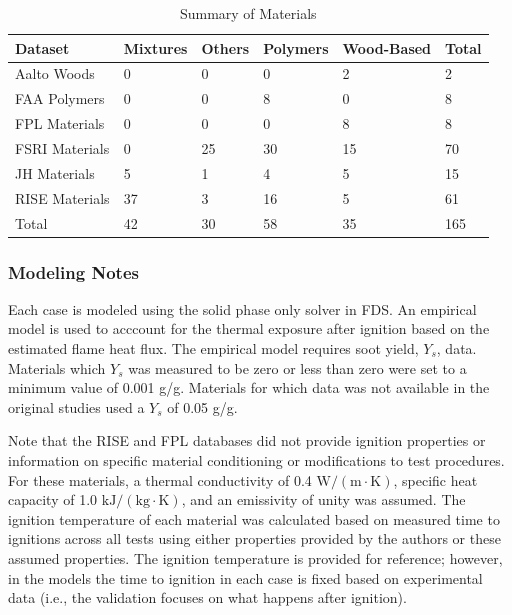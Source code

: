 \begin{table}[!h]
\caption[Summary of Materials]{Summary of Materials}
\centering
\begin{tabular}{|l|p{1.6cm}|p{1.6cm}|p{1.6cm}|p{1.6cm}|p{1.6cm}|}
\hline
Dataset             & Mixtures    & Others      & Polymers    & Wood-Based  & Total       \\ \hline
Aalto Woods         & 0           & 0           & 0           & 2           & 2           \\ \hline
FAA Polymers        & 0           & 0           & 8           & 0           & 8           \\ \hline
FPL Materials       & 0           & 0           & 0           & 8           & 8           \\ \hline
FSRI Materials      & 0           & 25          & 30          & 15          & 70         \\ \hline
JH Materials        & 5           & 1           & 4           & 5           & 15          \\ \hline
RISE Materials      & 37          & 3           & 16          & 5           & 61          \\ \hline
Total               & 42          & 30          & 58          & 35          & 165         \\ \hline
\end{tabular}
\label{Scaling_Pyrolysis_Materials}
\end{table}


\subsubsection{Modeling Notes}

Each case is modeled using the solid phase only solver in FDS.
An empirical model is used to acccount for the thermal exposure after ignition based on the estimated flame heat flux.
The empirical model requires soot yield, $Y_{s}$, data.
Materials which $Y_{s}$ was measured to be zero or less than zero were set to a minimum value of 0.001 g/g.
Materials for which data was not available in the original studies used a $Y_{s}$ of 0.05 g/g.

Note that the RISE and FPL databases did not provide ignition properties or information on specific material conditioning or modifications to test procedures.
For these materials, 
a thermal conductivity of 0.4 $\mathrm{W/(m\cdot K)}$,
specific heat capacity of 1.0 $\mathrm{kJ/(kg\cdot K)}$,
and an emissivity of unity was assumed.
The ignition temperature of each material was calculated based on measured time to ignitions across all tests using either properties provided by the authors or these assumed properties.
The ignition temperature is provided for reference; however, in the models the time to ignition in each case is fixed based on experimental data (i.e., the validation focuses on what happens after ignition).

